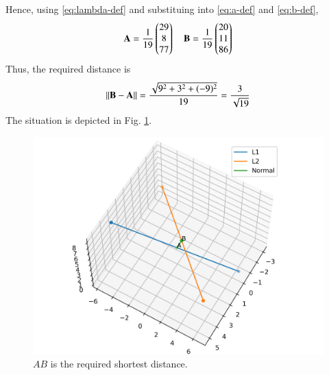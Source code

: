 \documentclass[journal,12pt,twocolumn]{IEEEtran}
\renewcommand{\vec}[1]{\boldsymbol{\mathbf{#1}}}
\begin{document}
\begin{enumerate}
    Hence, using \eqref{eq:lambda-def} and substituing into \eqref{eq:a-def} and \eqref{eq:b-def},
    \begin{align}
        \vec{A} = \frac{1}{19}\myvec{29\\8\\77} \quad \vec{B} = \frac{1}{19}\myvec{20\\11\\86}
    \end{align}
    Thus, the required distance is
    \begin{align}
        \norm{\vec{B}-\vec{A}} = \frac{\sqrt{9^2 +3^2 +(-9)^2}}{19} = \frac{3}{\sqrt{19}}
    \end{align}
    The situation is depicted in Fig. \ref{fig:skew}.

    \begin{figure}[!ht]
        \centering
        \includegraphics[width=\columnwidth]{figs/skew.png}
        \caption{$AB$ is the required shortest distance.}
        \label{fig:skew}
    \end{figure}
\end{enumerate}
\end{document}
